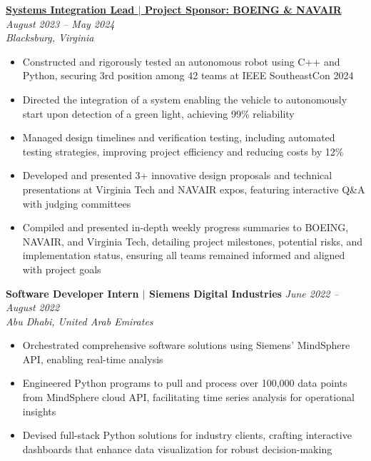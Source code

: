 \documentclass[letterpaper,11pt]{article}
\begin{document}
  \item \textbf{\href{https://www.youtube.com/watch?v=jMc0rQBXLdU}{Systems Integration Lead $|$ Project Sponsor: BOEING \& NAVAIR}} \hfill \textit{\small August 2023 -- May 2024} \\
  \small \textit{Blacksburg, Virginia} \vspace{-0.1\baselineskip}  %
  \begin{itemize}[leftmargin=5mm, itemsep=0pt, topsep=0pt]  %
    \item \small Constructed and rigorously tested an autonomous robot using C++ and Python, securing 3rd position among 42 teams at IEEE SoutheastCon 2024
    \item \small Directed the integration of a system enabling the vehicle to autonomously start upon detection of a green light, achieving 99\% reliability
    \item \small Managed design timelines and verification testing, including automated testing strategies, improving project efficiency and reducing costs by 12\%
    \item \small Developed and presented 3+ innovative design proposals and technical presentations at Virginia Tech and NAVAIR expos, featuring interactive Q\&A with judging committees
    \item \small Compiled and presented in-depth weekly progress summaries to BOEING, NAVAIR, and Virginia Tech, detailing project milestones, potential risks, and implementation status, ensuring all teams remained informed and aligned with project goals
  \end{itemize}

  \item \textbf{Software Developer Intern $|$ Siemens Digital Industries} \hfill \textit{\small June 2022 -- August 2022} \\
  \small \textit{Abu Dhabi, United Arab Emirates} \vspace{-0.15\baselineskip} %
  \begin{itemize}[leftmargin=5mm, itemsep=0pt, topsep=0pt] %
    \item \small Orchestrated comprehensive software solutions using Siemens' MindSphere API, enabling real-time analysis
    \item \small Engineered Python programs to pull and process over 100,000 data points from MindSphere cloud API, facilitating time series analysis for operational insights
    \item \small Devised full-stack Python solutions for industry clients, crafting interactive dashboards that enhance data visualization for robust decision-making
  \end{itemize}
\end{document}
